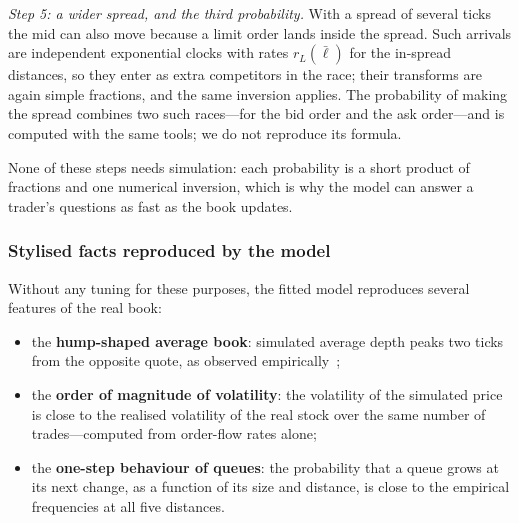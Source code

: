 \emph{Step 5: a wider spread, and the third probability.} With a spread of several ticks the mid can
also move because a limit order lands inside the spread. Such arrivals are independent exponential clocks
with rates $r_L(\bar\ell)$ for the in-spread distances, so they enter as extra competitors in the race;
their transforms are again simple fractions, and the same inversion applies. The probability of making
the spread combines two such races---for the bid order and the ask order---and is computed with the same
tools; we do not reproduce its formula.

None of these steps needs simulation: each probability is a short product of fractions and one numerical
inversion, which is why the model can answer a trader's questions as fast as the book updates.

\subsubsection{Stylised facts reproduced by the model}

Without any tuning for these purposes, the fitted model reproduces several features of the real book:
\begin{itemize}[leftmargin=1.5em,itemsep=2pt]
\item the \textbf{hump-shaped average book}: simulated average depth peaks two ticks from the opposite
  quote, as observed empirically~\citep{bouchaud2002};
\item the \textbf{order of magnitude of volatility}: the volatility of the simulated price is close to
  the realised volatility of the real stock over the same number of trades---computed from order-flow
  rates alone;
\item the \textbf{one-step behaviour of queues}: the probability that a queue grows at its next change,
  as a function of its size and distance, is close to the empirical frequencies at all five distances.
\end{itemize}

